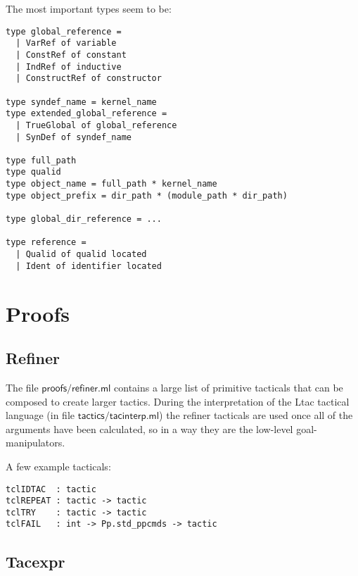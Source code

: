 \documentclass[a4paper,oneside]{book}
\newcommand{\m}[1]{\ensuremath{\mathsf{#1}}}
\begin{document}
The most important types seem to be:

\begin{lstlisting}
type global_reference =
  | VarRef of variable
  | ConstRef of constant
  | IndRef of inductive
  | ConstructRef of constructor

type syndef_name = kernel_name
type extended_global_reference =
  | TrueGlobal of global_reference
  | SynDef of syndef_name

type full_path
type qualid
type object_name = full_path * kernel_name
type object_prefix = dir_path * (module_path * dir_path)

type global_dir_reference = ...

type reference =
  | Qualid of qualid located
  | Ident of identifier located
\end{lstlisting}

\newpage

\section{Proofs}

\subsection{Refiner}

The file \m{proofs/refiner.ml} contains a large list of primitive
tacticals that can be composed to create larger tactics. During the
interpretation of the Ltac tactical language (in file
\m{tactics/tacinterp.ml}) the refiner tacticals are used once all of
the arguments have been calculated, so in a way they are the low-level
goal-manipulators.

A few example tacticals:

\begin{lstlisting}
tclIDTAC  : tactic
tclREPEAT : tactic -> tactic
tclTRY    : tactic -> tactic
tclFAIL   : int -> Pp.std_ppcmds -> tactic
\end{lstlisting}

\subsection{Tacexpr}
\end{document}

